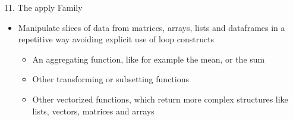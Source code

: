 \documentclass[14pt, aspectratio=169, sectionpage=simple, xclolor=table]{beamer}
\begin{document}
\begin{frame}[fragile]{11. The apply Family}
\begin{itemize}
\item Manipulate slices of data from matrices, arrays, lists and dataframes in a repetitive way avoiding explicit use of loop constructs
\nl
\begin{itemize}
\item An aggregating function, like for example the mean, or the sum 
\item Other transforming or subsetting functions
\item Other vectorized functions, which return more complex structures like lists, vectors, matrices and arrays
\end{itemize}
\end{itemize}

\end{frame}
\end{document}
